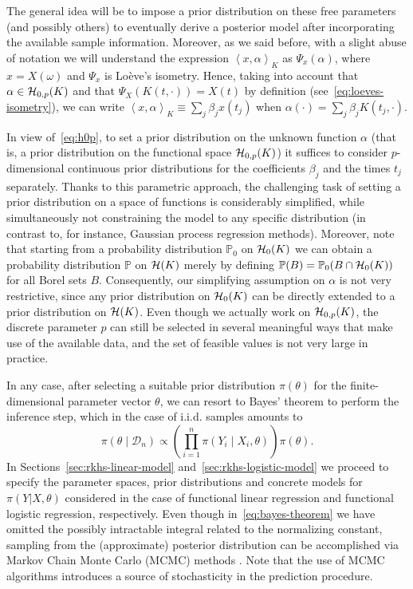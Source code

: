 \documentclass[ba]{imsart}
\numberwithin{equation}{section}
\theoremstyle{plain}
\newcommand{\Hcal}{\ensuremath\mathcal{H}}
\newcommand\dotprod[2]{\left\langle #1, #2 \right\rangle}
\begin{document}
The general idea will be to impose a prior distribution on these free parameters (and possibly others) to eventually derive a posterior model after incorporating the available sample information.  Moreover, as we said before, with a slight abuse of notation we will understand the expression \(\dotprod{x}{\alpha}_K\) as \(\Psi_x(\alpha)\), where \(x=X(\omega)\) and \(\Psi_x\) is Loève's isometry. Hence, taking into account that \(\alpha \in \Hcal_{0,p}(K)\) and that \(\Psi_X(K(t, \cdot)) = X(t)\) by definition (see~\eqref{eq:loeves-isometry}), we can write \(\dotprod{x}{\alpha}_K \equiv \sum_j \beta_j x(t_j)\) when \(\alpha(\cdot)=\sum_j\beta_j K(t_j, \cdot)\).

In view of~\eqref{eq:h0p}, to set a prior distribution on the unknown function \(\alpha\) (that is, a prior distribution on the functional space \(\Hcal_{0,p}(K)\)) it suffices to consider \(p\)-dimensional continuous prior distributions for the coefficients \(\beta_j\) and the times \(t_j\) separately. Thanks to this parametric approach, the challenging task of setting a prior distribution on a space of functions is considerably simplified, while simultaneously not constraining the model to any specific distribution (in contrast to, for instance, Gaussian process regression methods). Moreover, note that starting from a probability distribution \(\mathbb{P}_0\) on \(\Hcal_0(K)\) we can obtain a probability distribution \(\mathbb{P}\) on \(\Hcal(K)\) merely by defining \(\mathbb{P}(B) = \mathbb{P}_0(B\cap \Hcal_0(K))\) for all Borel sets \(B\). Consequently, our simplifying assumption on \(\alpha\) is not very restrictive, since any prior distribution on \(\Hcal_0(K)\) can be directly extended to a prior distribution on \(\Hcal(K)\). Even though we actually work on \(\Hcal_{0,p}(K)\), the discrete parameter \(p\) can still be selected in several meaningful ways that make use of the available data, and the set of feasible values is not very large in practice.

In any case, after selecting a suitable prior distribution \(\pi(\theta)\) for the finite-dimensional parameter vector \(\theta\), we can resort to Bayes' theorem to perform the inference step, which in the case of i.i.d. samples amounts to
\begin{equation}\label{eq:bayes-theorem}
  \pi(\theta \mid \mathcal D_n) \propto \left( \prod_{i=1}^n \pi(Y_i\mid X_i, \theta) \right)\pi(\theta).
\end{equation}
In Sections~\ref{sec:rkhs-linear-model} and~\ref{sec:rkhs-logistic-model} we proceed to specify the parameter spaces, prior distributions and concrete models for \(\pi(Y | X,\theta)\) considered in the case of functional linear regression and functional logistic regression, respectively. Even though in~\eqref{eq:bayes-theorem} we have omitted the possibly intractable integral related to the normalizing constant, sampling from the (approximate) posterior distribution can be accomplished via Markov Chain Monte Carlo (MCMC) methods \citep[e.g.][]{brooks2011handbook}. Note that the use of MCMC algorithms introduces a source of stochasticity in the prediction procedure.
\end{document}
